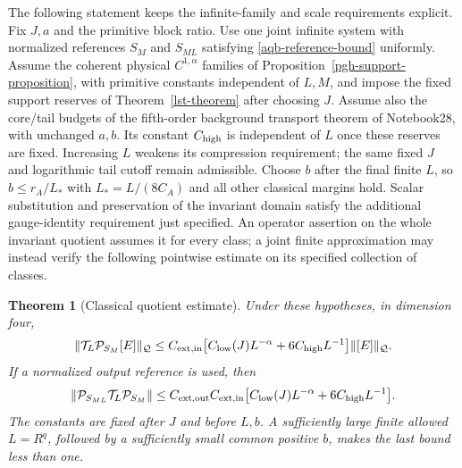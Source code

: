 \documentclass[11pt]{article}
\newtheorem{theorem}{Theorem}[section]
\theoremstyle{remark}
\begin{document}
The following statement keeps the infinite-family and scale
requirements explicit. Fix $J,a$ and the primitive block ratio.
Use one joint infinite system with normalized references $S_M$
and $S_{ML}$ satisfying \eqref{aqb-reference-bound} uniformly.
Assume the coherent physical $C^{1,\alpha}$ families of
Proposition~\ref{pgh-support-proposition}, with primitive
constants independent of $L,M$, and impose the fixed support
reserves of Theorem~\ref{lst-theorem} after choosing $J$.
Assume also the core/tail budgets of the fifth-order background
transport theorem of Notebook28, with unchanged $a,b$.
Its constant $C_{\rm high}$ is independent of $L$ once these
reserves are fixed. Increasing $L$ weakens its compression
requirement; the same fixed $J$ and logarithmic tail cutoff
remain admissible. Choose $b$ after the final finite $L$, so
$b\le r_A/L_*$ with $L_*=L/(8C_A)$ and all other classical
margins hold. Scalar substitution and preservation of the
invariant domain satisfy the additional gauge-identity requirement
just specified. An operator assertion on the whole invariant
quotient assumes it for every class; a joint finite approximation
may instead verify the following pointwise estimate on its
specified collection of classes.

\begin{theorem}[Classical quotient estimate]
\label{aqb-classical-theorem}
Under these hypotheses, in dimension four,
\begin{equation}
 \|\mathcal T_L\mathcal P_{S_M}[E]\|_{\mathcal Q}
 \le C_{{\rm ext,in}}
       \bigl[C_{\rm low}(J)L^{-\alpha}
                    +6C_{\rm high}L^{-1}\bigr]
                     \|[E]\|_{\mathcal Q}.
 \label{aqb-classical-bound}
\end{equation}
If a normalized output reference is used, then
\begin{equation}
 \|\mathcal P_{S_{ML}}\mathcal T_L\mathcal P_{S_M}\|
 \le C_{{\rm ext,out}}C_{{\rm ext,in}}
       \bigl[C_{\rm low}(J)L^{-\alpha}
                    +6C_{\rm high}L^{-1}\bigr].
 \label{aqb-projected-contraction}
\end{equation}
The constants are fixed after $J$ and before $L,b$. A sufficiently
large finite allowed $L=R^q$, followed by a sufficiently small
common positive $b$, makes the last bound less than one.
\end{theorem}
\end{document}
